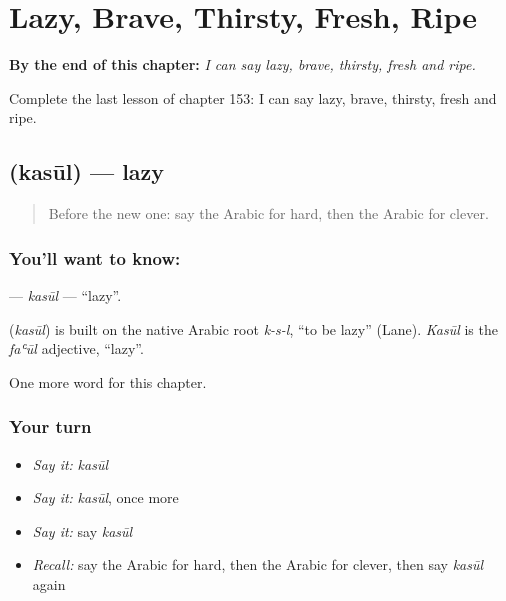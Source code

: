 
\chapter{Lazy, Brave, Thirsty, Fresh, Ripe}
\label{ch:ar-lazy-brave-thirsty-fresh-ripe}

\begin{chapteropening}
\textbf{By the end of this chapter:} \emph{I can say lazy, brave, thirsty, fresh and ripe.}

Complete the last lesson of chapter 153: I can say lazy, brave, thirsty, fresh and ripe.
\end{chapteropening}

\section[\texorpdfstring{\ar{كسول} (kasūl)}{كسول (kasūl)}]{ (kasūl) — lazy}

\label{lesson:AR-C153-kasul}



\begin{quote}
Before the new one: say the Arabic for hard, then the Arabic for clever.
\end{quote}

\subsection*{You'll want to know: }
\textbf{} — \emph{kasūl} — \textquotedblleft{}lazy\textquotedblright{}.

\begin{cousinweb}
\textbf{} (\emph{kasūl}) is built on the native Arabic root \emph{k-s-l}, \textquotedblleft{}to be lazy\textquotedblright{} (Lane). \emph{Kasūl} is the \emph{faʿūl} adjective, \textquotedblleft{}lazy\textquotedblright{}.
\end{cousinweb}

\begin{grammarlens}[title={What you've built}]
One more word for this chapter.
\end{grammarlens}

\subsection*{Your turn}
\begin{itemize}
\raggedright
  \item \emph{Say it:} \emph{kasūl}
  \item \emph{Say it:} \emph{kasūl}, once more
  \item \emph{Say it:} say \emph{kasūl}
  \item \emph{Recall:} say the Arabic for hard, then the Arabic for clever, then say \emph{kasūl} again
\end{itemize}


